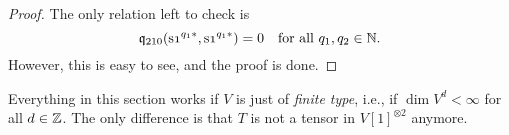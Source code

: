 \documentclass[\MainFolder/Text.tex]{subfiles}
\begin{document}
\begin{proof}
The only relation left to check is
$$ \OPQ_{210}(\Susp \NOne^{q_1 *},\Susp \NOne^{q_1 *}) = 0 \quad\text{for all } q_1, q_2 \in \N.$$
However, this is easy to see, and the proof is done. 
\end{proof}

\begin{Remark}
Everything in this section works if $V$ is just of \emph{finite type}, i.e., if $\dim V^d < \infty$ for all $d\in \mathbb{Z}$. The only difference is that $T$ is not a tensor in $V[1]^{\otimes 2}$ anymore.
\end{Remark}
\end{document}
